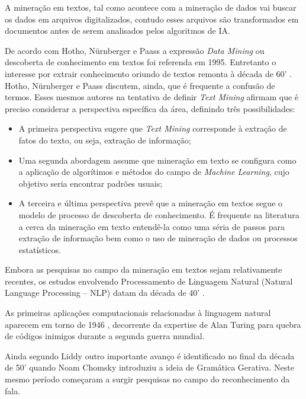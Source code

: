 A mineração em textos, tal como acontece com a mineração de dados vai buscar os dados em arquivos digitalizados, contudo esses arquivos são transformados em documentos antes de serem analisados pelos algoritmos de IA.

De acordo com Hotho, Nürnberger e Paass  \cite{hotho2005brief} a expressão \textit{Data Mining} ou descoberta de conhecimento em textos foi referenda em 1995. Entretanto o interesse por extrair conhecimento oriundo de textos remonta à década de 60' \cite{stone1968general}. Hotho, Nürnberger e Paass  \cite{hotho2005brief} discutem, ainda, que é frequente a confusão de termos. Esses mesmos autores \cite{hotho2005brief} na tentativa de definir \textit{Text Mining} afirmam que é preciso considerar a perspectiva específica da área, definindo três possibilidades:

\begin{itemize}
	\item A primeira perspectiva sugere que \textit{Text Mining} corresponde à extração de fatos do texto, ou seja, extração de informação;
	\item Uma segunda abordagem assume que mineração em texto se configura como a aplicação de algorítimos e métodos do campo de \textit{Machine Learning}, cujo objetivo seria encontrar padrões usuais;
	\item A terceira e última perspectiva prevê que a mineração em textos segue o modelo de processo de descoberta de conhecimento. É frequente na literatura a cerca da mineração em texto entendê-la como uma séria de passos para extração de informação bem como o uso de mineração de dados ou processos estatísticos.
\end{itemize}

Embora as pesquisas no campo da mineração em textos sejam relativamente recentes, os estudos envolvendo Processamento de Linguagem Natural (Natural Language Processing -- NLP) datam da década de 40' \cite{liddy2001natural}. 

As primeiras aplicações computacionais relacionadas à linguagem natural aparecem em torno de 1946 \cite{liddy2001natural},  decorrente da expertise de Alan Turing para quebra de códigos inimigos durante a segunda guerra mundial. 

Ainda segundo Liddy \cite{liddy2001natural} outro importante avanço é identificado no final da década de 50' quando Noam Chomsky introduziu a ideia de Gramática Gerativa. Neste mesmo período começaram a surgir pesquisas no campo do reconhecimento da fala. 

